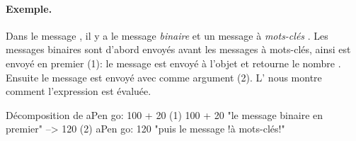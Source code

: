 \documentclass[a4paper,10pt,twoside]{book}
\begin{document}
\paragraph{Exemple.} Dans le message , il y a le message \emph{binaire}  et un message à \emph{mots-clés} . Les messages binaires sont d'abord envoyés avant les messages à mots-clés, ainsi  est envoyé en premier (1): le message  est envoyé à l'objet  et retourne le nombre . Ensuite le message  est envoyé avec comme argument  (2).
L' nous montre comment l'expression est évaluée. 

\begin{example}[decGo]{Décomposition de }{}
      aPen go: 100 + 20   
(1)                 100 + 20           "le message binaire en premier"
                   -->   120
(2)  aPen go: 120                   "puis le message !à mots-clés!"
\end{example}
\end{document}

